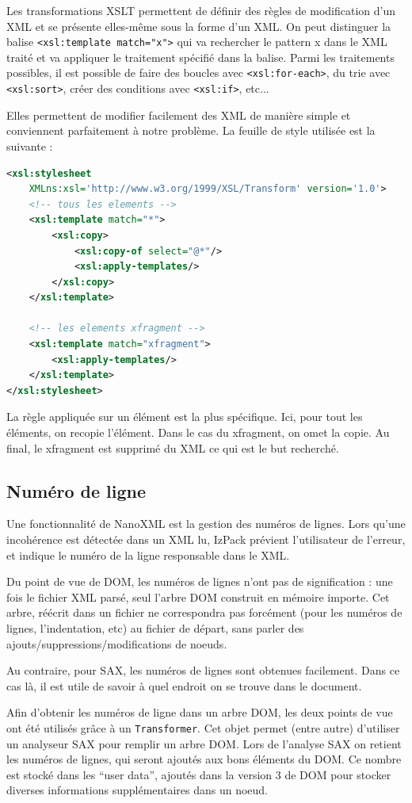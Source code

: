 Les transformations XSLT permettent de définir des règles de modification d'un XML et se présente elles-même sous la forme d'un XML.
On peut distinguer la balise \verb|<xsl:template match="x">| qui va rechercher le pattern x dans le XML traité et va appliquer le traitement spécifié dans la balise.
Parmi les traitements possibles, il est possible de faire des boucles avec \verb|<xsl:for-each>|, du trie avec \verb|<xsl:sort>|, créer des conditions avec \verb|<xsl:if>|, etc...

Elles permettent de modifier facilement des XML de manière simple et conviennent parfaitement à notre problème.
La feuille de style utilisée est la suivante :
\begin{lstlisting}[language=XML]
<xsl:stylesheet 
	XMLns:xsl='http://www.w3.org/1999/XSL/Transform' version='1.0'>
    <!-- tous les elements -->
    <xsl:template match="*">
        <xsl:copy>
            <xsl:copy-of select="@*"/>
            <xsl:apply-templates/>
        </xsl:copy>
    </xsl:template>

    <!-- les elements xfragment -->
    <xsl:template match="xfragment">
        <xsl:apply-templates/>
    </xsl:template>
</xsl:stylesheet>
\end{lstlisting}

La règle appliquée sur un élément est la plus spécifique.
Ici, pour tout les éléments, on recopie l'élément.
Dans le cas du xfragment, on omet la copie.
Au final, le xfragment est supprimé du XML ce qui est le but recherché.
\subsection{Numéro de ligne}
Une fonctionnalité de NanoXML est la gestion des numéros de lignes.
Lors qu'une incohérence est détectée dans un XML lu, IzPack prévient l'utilisateur de l'erreur, et indique le numéro de la ligne responsable dans le XML.

Du point de vue de DOM, les numéros de lignes n'ont pas de signification : une fois le fichier XML parsé, seul l'arbre DOM construit en mémoire importe.
Cet arbre, réécrit dans un fichier ne correspondra pas forcément (pour les numéros de lignes, l'indentation, etc) au fichier de départ, sans parler des ajouts/suppressions/modifications de noeuds.

Au contraire, pour SAX, les numéros de lignes sont obtenues facilement.
Dans ce cas là, il est utile de savoir à quel endroit on se trouve dans le document.

Afin d'obtenir les numéros de ligne dans un arbre DOM, les deux points de vue ont été utilisés grâce à un \verb|Transformer|.
Cet objet permet (entre autre) d'utiliser un analyseur SAX pour remplir un arbre DOM.
Lors de l'analyse SAX on retient les numéros de lignes, qui seront ajoutés aux bons éléments du DOM.
Ce nombre est stocké dans les ``user data'', ajoutés dans la version 3  de DOM pour stocker diverses informations supplémentaires dans un noeud.

